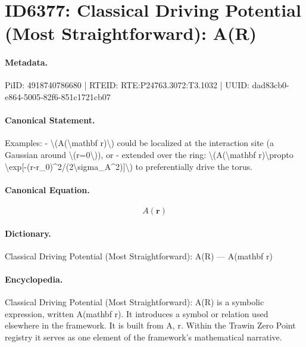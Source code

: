 \section*{ID6377: Classical Driving Potential (Most Straightforward): A(R)}
\paragraph{Metadata.}
PiID: 4918740786680 | RTEID: RTE:P24763.3072:T3.1032 | UUID: dad83cb0-e864-5005-82f6-851c1721cb07

\paragraph{Canonical Statement.}
Examples: - \textbackslash{}(A(\textbackslash{}mathbf r)\textbackslash{}) could be localized at the interaction site (a Gaussian around \textbackslash{}(r=0\textbackslash{})), or - extended over the ring: \textbackslash{}(A(\textbackslash{}mathbf r)\textbackslash{}propto \textbackslash{}exp[-(r-r\_0)\textasciicircum{}2/(2\textbackslash{}sigma\_A\textasciicircum{}2)]\textbackslash{}) to preferentially drive the torus.

\paragraph{Canonical Equation.}
\[
A(\mathbf r)
\]

\paragraph{Dictionary.}
Classical Driving Potential (Most Straightforward): A(R) — A(mathbf r)

\paragraph{Encyclopedia.}
Classical Driving Potential (Most Straightforward): A(R) is a symbolic expression, written A(mathbf r). It introduces a symbol or relation used elsewhere in the framework. It is built from A, r. Within the Trawin Zero Point registry it serves as one element of the framework's mathematical narrative.
